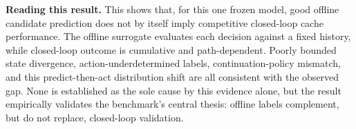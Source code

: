 \textbf{Reading this result.} This shows that, for this one frozen model,
good offline candidate prediction does not by itself imply competitive
closed-loop cache performance. The offline surrogate evaluates each
decision against a fixed history, while closed-loop outcome is cumulative
and path-dependent. Poorly bounded state divergence,
action-underdetermined labels, continuation-policy mismatch, and this
predict-then-act distribution shift are all consistent with the observed gap. None is established as the sole cause by this evidence alone, but the result empirically validates the benchmark's central thesis: offline labels complement, but do not replace, closed-loop validation.
